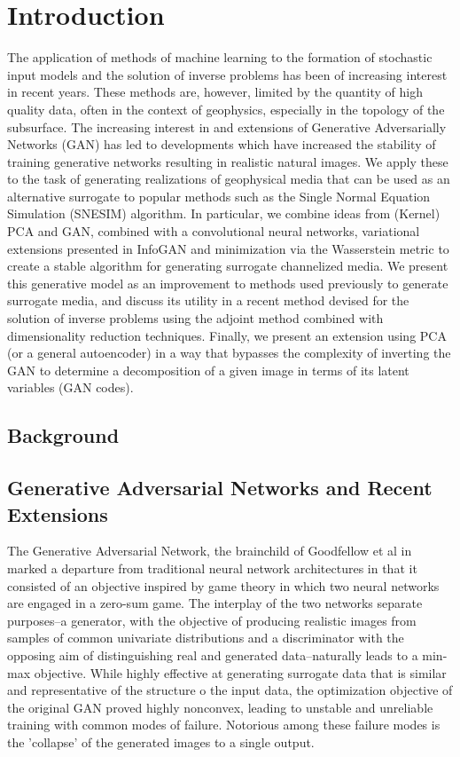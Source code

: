 \documentclass{article}
\begin{document}
\section{Introduction}
The application of methods of machine learning to the formation of stochastic input models and the solution of inverse problems has been of increasing interest in recent years.  These methods are, however, limited by the quantity of high quality data, often in the context of geophysics, especially in the topology of the subsurface.  The increasing interest in and extensions of Generative Adversarially Networks (GAN) has led to developments which have increased the stability of training generative networks resulting in realistic natural images.  We apply these to the task of generating realizations of geophysical media that can be used as an alternative surrogate to popular methods such as the Single Normal Equation Simulation (SNESIM) algorithm.  In particular, 	we combine ideas from (Kernel) PCA and GAN, combined with a convolutional neural networks, variational extensions presented in InfoGAN and minimization via the Wasserstein metric to create a stable algorithm for generating surrogate channelized media.  We present this generative model as an improvement to methods used previously to generate surrogate media, and discuss its utility in a recent method devised for the solution of inverse problems using the adjoint method combined with dimensionality reduction techniques.  Finally, we present an extension using PCA (or a general autoencoder) in a way that bypasses the complexity of inverting the GAN to determine a decomposition of a given image in terms of its latent variables (GAN codes).



\subsection{Background}

\subsection{Generative Adversarial Networks and Recent Extensions}
	The Generative Adversarial Network, the brainchild of Goodfellow et al in \cite{Goodfellow2014GenerativeNetworks} marked a departure from traditional neural network architectures in that it consisted of an objective inspired by game theory in which two neural networks are engaged in a zero-sum game.  The interplay of the two networks separate purposes--a generator, with the objective of producing realistic images from samples of common univariate distributions and a  discriminator with the opposing aim of distinguishing real and generated data--naturally leads to a min-max objective.  While highly effective at generating surrogate data that is similar and representative of the structure o the input data, the optimization objective of the original GAN proved highly nonconvex, leading to unstable and unreliable training with common modes of failure.  Notorious among these failure modes is the 'collapse' of the generated images to a single output.
\end{document}
